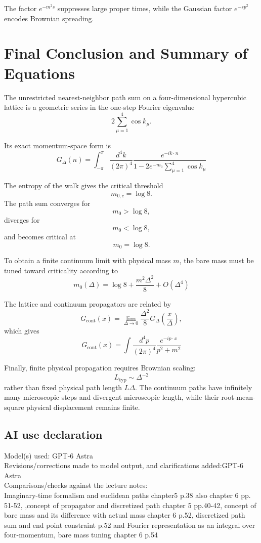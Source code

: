 \documentclass[11pt]{article}
\begin{document}
	The factor $e^{-m^2s}$ suppresses large proper times, while the
	Gaussian factor $e^{-sp^2}$ encodes Brownian spreading.
	
	\section{Final Conclusion and Summary of Equations}
	
	The unrestricted nearest-neighbor path sum on a four-dimensional
	hypercubic lattice is a geometric series in the one-step Fourier
	eigenvalue
	\[
	2\sum_{\mu=1}^{4}\cos k_\mu.
	\]
	
	Its exact momentum-space form is
	\[
	\boxed{
		G_\Delta(n)
		=
		\int_{-\pi}^{\pi}\frac{d^4k}{(2\pi)^4}
		\frac{e^{-ik\cdot n}}
		{1-2e^{-m_0}\displaystyle\sum_{\mu=1}^{4}\cos k_\mu}
	}
	\]
	
	The entropy of the walk gives the critical threshold
	\[
	m_{0,c}=\log8.
	\]
	The path sum converges for
	\[
	m_0>\log8,
	\]
	diverges for
	\[
	m_0<\log8,
	\]
	and becomes critical at
	\[
	m_0=\log8.
	\]
	
	To obtain a finite continuum limit with physical mass $m$, the bare
	mass must be tuned toward criticality according to
	\[
	\boxed{
		m_0(\Delta)
		=
		\log8+\frac{m^2\Delta^2}{8}
		+O(\Delta^4)
	}
	\]
	
	The lattice and continuum propagators are related by
	\[
	G_{\mathrm{cont}}(x)
	=
	\lim_{\Delta\to0}
	\frac{\Delta^2}{8}
	G_\Delta\left(\frac{x}{\Delta}\right),
	\]
	which gives
	\[
	\boxed{
		G_{\mathrm{cont}}(x)
		=
		\int\frac{d^4p}{(2\pi)^4}
		\frac{e^{-ip\cdot x}}{p^2+m^2}
	}
	\]
	
	Finally, finite physical propagation requires Brownian scaling:
	\[
	\boxed{
		L_{\mathrm{typ}}\sim\Delta^{-2}
	}
	\]
	rather than fixed physical path length $L\Delta$. The continuum paths
	have infinitely many microscopic steps and divergent microscopic
	length, while their root-mean-square physical displacement remains
	finite.
	
	\subsection*{AI use declaration}
	
	Model(s) used: GPT-6 Astra\\
	
	Revisions/corrections made to model output, and clarifications added:GPT-6 Astra \\
	
	Comparisons/checks against the lecture notes:\\ 
	Imaginary-time formalism and euclidean paths chapter5 p.38 also chapter 6 pp. 51-52, ,concept of propagator and discretized path chapter 5 pp.40-42, concept of bare mass and its difference with actual mass chapter 6 p.52, discretized path sum and end point constraint p.52 and Fourier representation as an integral over four-momentum, bare mass tuning chapter 6 p.54 
	
\end{document}
